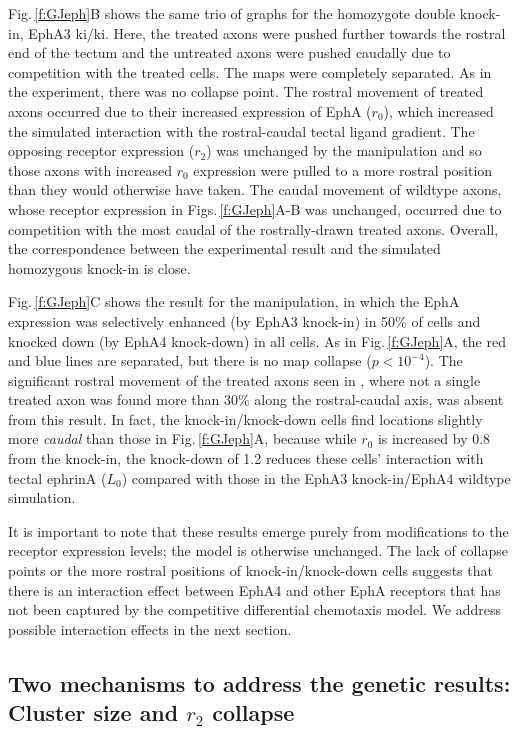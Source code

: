 \documentclass[9pt,lineno]{elife}
\begin{document}
Fig.\,\ref{f:GJeph}B shows the same trio of graphs for the homozygote double knock-in, EphA3 ki/ki. Here, the treated axons were pushed further towards the rostral end of the tectum and the untreated axons were pushed caudally due to competition with the treated cells. 
The maps were completely separated. As in the experiment, there was no collapse point.
The rostral movement of treated axons occurred due to their increased expression of EphA ($r_0$), which increased the simulated interaction with the rostral-caudal tectal ligand gradient. 
The opposing receptor expression ($r_2$) was unchanged by the manipulation and so those axons with increased $r_0$ expression were pulled to a more rostral position than they would otherwise have taken. 
The caudal movement of wildtype axons, whose receptor expression in Figs.\,\ref{f:GJeph}A-B was unchanged, occurred due to competition with the most caudal of the rostrally-drawn treated axons.
Overall, the correspondence between the experimental result and the simulated homozygous knock-in is close.

Fig.\,\ref{f:GJeph}C shows the result for the \citet{reber_relative_2004} manipulation, in which the EphA expression was selectively enhanced (by EphA3 knock-in) in 50\% of cells and knocked down (by EphA4 knock-down) in all cells.
As in Fig.\,\ref{f:GJeph}A, the red and blue lines are separated, but there is no map collapse ($p<10^{-4}$). 
The significant rostral movement of the treated axons seen in \citet{reber_relative_2004}, where not a single treated axon was found more than 30\% along the rostral-caudal axis, was absent from this result. 
In fact, the knock-in/knock-down cells find locations slightly more \emph{caudal} than those in Fig.\,\ref{f:GJeph}A, because while $r_0$ is increased by 0.8 from the knock-in, the knock-down of 1.2 reduces these cells' interaction with tectal ephrinA ($L_0$) compared with those in the EphA3 knock-in/EphA4 wildtype simulation.

It is important to note that these results emerge purely from modifications to the receptor expression levels; the model is otherwise unchanged. 
The lack of collapse points or the more rostral positions of knock-in/knock-down cells suggests that there is an interaction effect between EphA4 and other EphA receptors that has not been captured by the competitive differential chemotaxis model.
We address possible interaction effects in the next section.

\subsection*{Two mechanisms to address the genetic results: Cluster size and $r_2$ collapse}
\end{document}
